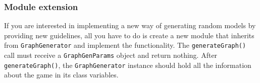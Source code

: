 \subsubsection*{Module extension}
If you are interested in implementing a new way of generating random models by providing new guidelines, all you have to do is create a new
module that inherits from \texttt{GraphGenerator} and implement the functionality. The \texttt{generateGraph()} call must receive a \texttt{GraphGenParams} object and return nothing.
After \texttt{generateGraph()}, the \texttt{GraphGenerator} instance should hold all the information about the game in its class variables.
\FloatBarrier